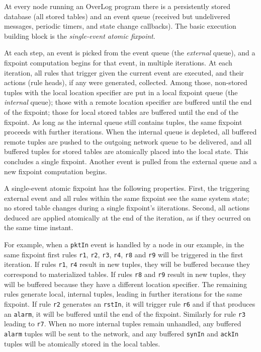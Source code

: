 \documentclass[10pt,twocolumn]{MyTightStyle}
\newcommand{\ol}[1]{{\tt\footnotesize#1}}
\begin{document}
At every node running an OverLog program there is a persistently stored
database (all stored tables) and an event queue (received but
undelivered messages, periodic timers, and state change callbacks).
The basic execution building block is the \emph{single-event atomic
  fixpoint}.

At each step, an event is picked from the event queue (the
\emph{external} queue), and a
fixpoint computation begins for that event, in multiple iterations. At each iteration,
all rules that trigger given the current event are executed, and their
actions (rule heads), if any were generated, collected. Among those,
non-stored tuples with the local location specifier are put in a local
fixpoint queue (the \emph{internal} queue); those with a remote location specifier are buffered
until the end of the fixpoint; those for local stored tables
are buffered until the end of the fixpoint. As long as the internal
queue still contains tuples, the same fixpoint proceeds with further
iterations. When the internal queue is depleted, all buffered 
remote tuples are pushed to the outgoing network queue to be delivered,
and all buffered tuples for stored tables are atomically placed into the
local state. This concludes a single fixpoint. Another event is pulled
from the external queue and a new fixpoint computation begins.

A single-event atomic fixpoint has the following properties. First, the
triggering external event and all rules within the same fixpoint 
see the same system state; no stored table changes during a single
fixpoint's iiterations. Second, all actions deduced are applied atomically at the 
end of the iteration, as if they ocurred on the same time instant.

For example, when a \ol{pktIn} event is handled by a node in our
example, in the same fixpoint first rules \ol{r1}, \ol{r2}, \ol{r3},
\ol{r4}, \ol{r8} and \ol{r9} will be triggered in the first
iteration. If rules \ol{r1}, \ol{r4} result in new tuples, they will be
buffered because they correspond to materialized tables. If rules
\ol{r8} and \ol{r9} result in new tuples, they will be buffered because
they have a different location specifier. The remaining rules generate
local, internal tuples, leading in further iterations for the same
fixpoint. If rule \ol{r2} generates an \ol{rstIn}, it will trigger rule
\ol{r6} and if that produces an \ol{alarm}, it will be buffered until
the end of the fixpoint. Similarly for rule \ol{r3} leading to
\ol{r7}. When no more internal tuples remain unhandled, any buffered
\ol{alarm} tuples will be sent to the network, and any buffered
\ol{synIn} and \ol{ackIn} tuples will be atomically stored in the local tables.
\end{document}
